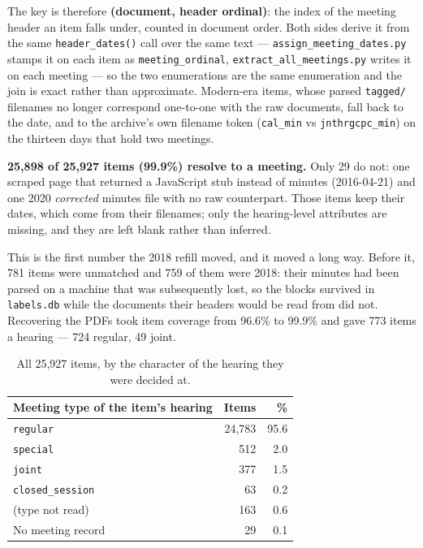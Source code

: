 \documentclass[11pt]{article}
\begin{document}
The key is therefore \textbf{(document, header ordinal)}: the index of the meeting header an
item falls under, counted in document order. Both sides derive it from the same
\texttt{header\_dates()} call over the same text --- \texttt{assign\_meeting\_dates.py}
stamps it on each item as \texttt{meeting\_ordinal}, \texttt{extract\_all\_meetings.py}
writes it on each meeting --- so the two enumerations are the same enumeration and the join
is exact rather than approximate. Modern-era items, whose parsed \texttt{tagged/} filenames
no longer correspond one-to-one with the raw documents, fall back to the date, and to the
archive's own filename token (\texttt{cal\_min} vs \texttt{jnthrgcpc\_min}) on the thirteen
days that hold two meetings.

\textbf{25{,}898 of 25{,}927 items (99.9\%) resolve to a meeting.} Only 29 do not: one
scraped page that returned a JavaScript stub instead of minutes (2016-04-21) and one
2020 \emph{corrected} minutes file with no raw counterpart. Those items keep
their dates, which come from their filenames; only the hearing-level attributes are missing,
and they are left blank rather than inferred.

This is the first number the 2018 refill moved, and it moved a long way. Before it, 781
items were unmatched and 759 of them were 2018: their minutes had been parsed on a machine
that was subsequently lost, so the blocks survived in \texttt{labels.db} while the documents
their headers would be read from did not. Recovering the PDFs took item coverage from
96.6\% to 99.9\% and gave 773 items a hearing --- 724 regular, 49 joint.

\begin{table}[h]
\centering
\begin{tabular}{lrr}
\toprule
Meeting type of the item's hearing & Items & \% \\
\midrule
\texttt{regular}        & 24{,}783 & 95.6 \\
\texttt{special}        &     512 &  2.0 \\
\texttt{joint}          &     377 &  1.5 \\
\texttt{closed\_session} &      63 &  0.2 \\
(type not read)         &     163 &  0.6 \\
\midrule
No meeting record       &      29 &  0.1 \\
\bottomrule
\end{tabular}
\caption{All 25{,}927 items, by the character of the hearing they were decided at.}
\end{table}
\end{document}
